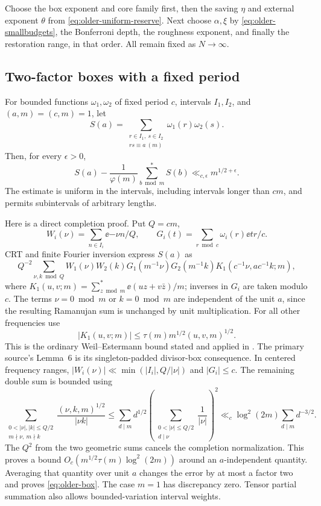 Choose the box exponent and core family first, then the saving \(\eta\)
and external exponent \(\theta\) from \eqref{eq:older-uniform-reserve}.
Next choose \(\alpha,\xi\) by \eqref{eq:older-smallbudgets}, the
Bonferroni depth, the roughness exponent, and finally the restoration
range, in that order. All remain fixed as \(N\to\infty\).

\subsection{Two-factor boxes with a fixed period}

For bounded functions \(\omega_1,\omega_2\) of fixed period \(c\),
intervals \(I_1,I_2\), and \((a,m)=(c,m)=1\), let
\[
 S(a)=\sum_{\substack{r\in I_1,\ s\in I_2\\rs\equiv a\ (m)}}
                        \omega_1(r)\omega_2(s).
\]
Then, for every \(\epsilon>0\),
\begin{equation}\label{eq:older-box}
 S(a)-\frac1{\varphi(m)}\sum_{b\bmod m}^{*}S(b)
                         \ll_{c,\epsilon}m^{1/2+\epsilon}.
\end{equation}
The estimate is uniform in the intervals, including intervals longer
than \(cm\), and permits subintervals of arbitrary lengths.

Here is a direct completion proof.  Put \(Q=cm\),
\[
 W_i(\nu)=\sum_{n\in I_i}\ee{-\nu n/Q},\qquad
 G_i(t)=\sum_{r\bmod c}\omega_i(r)\ee{tr/c}.
\]
CRT and finite Fourier inversion express \(S(a)\) as
\[
 Q^{-2}\sum_{\nu,k\bmod Q}
 W_1(\nu)W_2(k)G_1(m^{-1}\nu)G_2(m^{-1}k)
       K_1(c^{-1}\nu,ac^{-1}k;m),
\]
where \(K_1(u,v;m)=\sum_{z\bmod m}^{*}\ee{(uz+v\bar z)/m}\);
inverses in \(G_i\) are taken modulo \(c\).
The terms \(\nu=0\bmod m\) or \(k=0\bmod m\) are independent of
the unit \(a\), since the resulting Ramanujan sum is unchanged by
unit multiplication.  For all other frequencies use
\[
 |K_1(u,v;m)|\le\tau(m)m^{1/2}(u,v,m)^{1/2}.
\]
This is the ordinary Weil--Estermann bound stated and applied in
\cite[printed p.~44]{heathbrown}.  The primary source's
Lemma~6 is its singleton-padded divisor-box consequence.
In centered frequency ranges,
\(|W_i(\nu)|\ll\min(|I_i|,Q/|\nu|)\) and \(|G_i|\le c\).
The remaining double sum is bounded using
\[
 \sum_{\substack{0<|\nu|,|k|\le Q/2\\m\nmid \nu,\ m\nmid k}}
      \frac{(\nu,k,m)^{1/2}}{|\nu k|}
 \le \sum_{d\mid m}d^{1/2}
       \left(\sum_{\substack{0<|\nu|\le Q/2\\d\mid \nu}}\frac1{|\nu|}\right)^2
 \ll_c \log^2(2m)\sum_{d\mid m}d^{-3/2}.
\]
The \(Q^2\) from the two geometric sums cancels the completion
normalization.  This proves a bound
\(O_c(m^{1/2}\tau(m)\log^2(2m))\) around an \(a\)-independent
quantity.  Averaging that quantity over unit \(a\) changes the
error by at most a factor two and proves \eqref{eq:older-box}.
The case \(m=1\) has discrepancy zero.
Tensor partial summation also allows bounded-variation interval weights.

